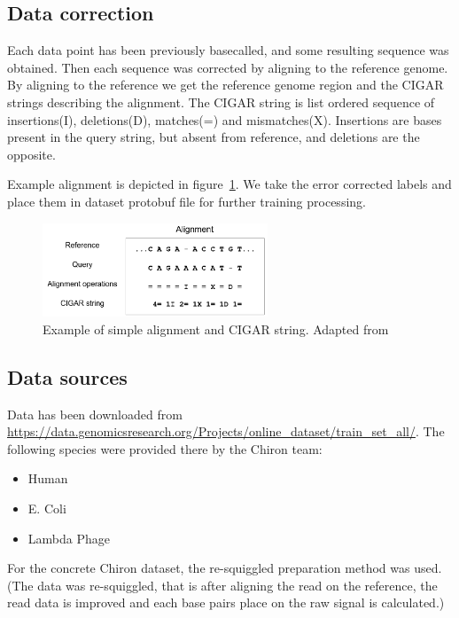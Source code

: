 \documentclass[times, utf8, diplomski, english]{fer}
\begin{document}
\subsection{Data correction}
Each data point has been previously basecalled, and some resulting sequence was obtained. Then each sequence was corrected by aligning to the reference genome. By aligning to the reference we get the reference genome region and the CIGAR strings describing the alignment. The CIGAR string is list ordered sequence of insertions(I), deletions(D), matches(=) and mismatches(X). Insertions are bases present in the query string, but absent from reference, and deletions are the opposite. 

Example alignment is depicted in figure~\ref{fg:align}. We take the error corrected labels and place them in dataset protobuf file for further training processing.

\begin{figure}
    \begin{center}
        \includegraphics[width=0.6\textwidth]{alignment}
        \caption{Example of simple alignment and CIGAR string. Adapted from~\citep{mratkovic}}
        \label{fg:align}
    \end{center}
\end{figure} 

\subsection{Data sources}

Data has been downloaded from \url{https://data.genomicsresearch.org/Projects/online_dataset/train_set_all/}.  The following species were provided there by the Chiron team:
\begin{itemize}
    \item Human
    \item E. Coli
    \item Lambda Phage
\end{itemize}

For the concrete Chiron dataset, the re-squiggled preparation method was used. (The data was re-squiggled, that is after aligning the read on the reference, the read data is improved and each base pairs place on the raw signal is calculated.)
\end{document}

